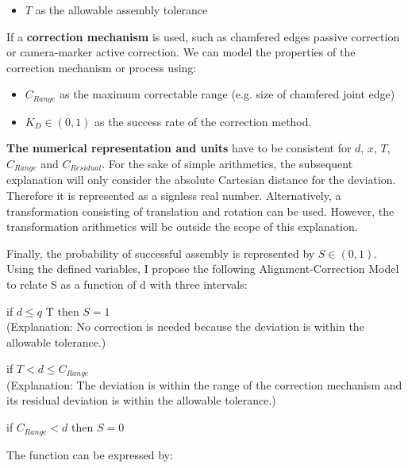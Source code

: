 \begin{itemize}
	\item $T$ as the allowable assembly tolerance 
\end{itemize}

If a \textbf{correction mechanism} is used, such as chamfered edges passive correction or camera-marker active correction. We can model the properties of the correction mechanism or process using: 

\begin{itemize}[nosep]
	\item $C_{Range}$ as the maximum correctable range (e.g. size of chamfered joint edge)

	\item  $K_D \in (0,1)$ as the success rate of the correction method. 

\end{itemize}

\textbf{The numerical representation and units }have to be consistent for $d$, $x$, $T$, $C_{Range}$ and $C_{Residual}$. For the sake of simple arithmetics, the subsequent explanation will only consider the absolute Cartesian distance for the deviation. Therefore it is represented as a signless real number. Alternatively, a transformation consisting of translation and rotation can be used. However, the transformation arithmetics will be outside the scope of this explanation. 

Finally, the probability of successful assembly is represented by $S \in (0, 1)$. Using the defined variables, I propose the following Alignment-Correction Model to relate S as a function of d with three intervals: 

\begin{description}[style=unboxed] %
	\item [No correction needed] if $d \le q$ T then $S = 1$\\ (Explanation: No correction is needed because the deviation is within the allowable tolerance.)

	\item [Correction success] if $T < d \leq C_{Range}$ \\ (Explanation: The deviation is within the range of the correction mechanism and its residual deviation is within the allowable tolerance.)

	\item [Correction failure] if $C_{Range} < d$ then $S = 0$

\end{description}
The function can be expressed by: 

